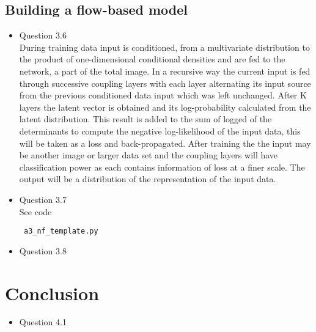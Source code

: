 \documentclass{article}
\begin{document}
      \subsection{Building a flow-based model}
        \begin{itemize}
          \item Question 3.6  \\
          During training data input is conditioned, from a multivariate distribution to the product of one-dimensional conditional densities and are fed to the network, a part of the total image. In a recursive way the current input is fed through successive coupling layers with each layer alternating its input source from the previous conditioned data input which was left unchanged. After K layers the latent vector is obtained and its log-probability calculated from the latent distribution. This result is added to the sum of logged of the determinants to compute the negative log-likelihood of the input data, this will be taken as a loss and back-propagated. After training the the input may be another image or larger data set and the coupling layers will have classification power as each contains information of loss at a finer scale. The output will be a distribution of the representation of the input data. 
          \item Question 3.7 \\ 
          See code \begin{verbatim} a3_nf_template.py\end{verbatim}
          \item Question 3.8
        \end{itemize}
  \section{Conclusion}
        \begin{itemize}
          \item Question 4.1
        \end{itemize}
    
\end{document}
